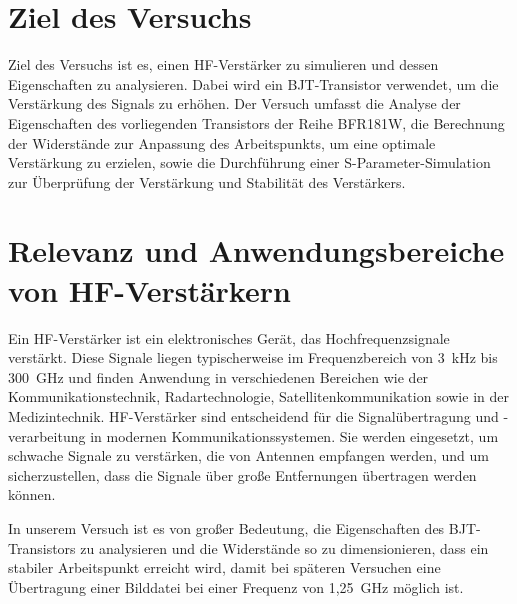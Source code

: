 \section{Ziel des Versuchs}
Ziel des Versuchs ist es, einen HF-Verstärker zu simulieren und dessen Eigenschaften zu analysieren. Dabei wird ein BJT-Transistor verwendet, um die Verstärkung des Signals zu erhöhen. 
Der Versuch umfasst die Analyse der Eigenschaften des vorliegenden Transistors der Reihe BFR181W, die Berechnung der Widerstände zur Anpassung des Arbeitspunkts, 
um eine optimale Verstärkung zu erzielen, sowie die Durchführung einer S-Parameter-Simulation zur Überprüfung der Verstärkung und Stabilität des Verstärkers.

\section{Relevanz und Anwendungsbereiche von HF-Verstärkern}
Ein HF-Verstärker ist ein elektronisches Gerät, das Hochfrequenzsignale verstärkt. Diese Signale liegen typischerweise im Frequenzbereich von 3~kHz bis 300~GHz und finden Anwendung in verschiedenen Bereichen wie der Kommunikationstechnik, Radartechnologie, Satellitenkommunikation sowie in der Medizintechnik.
HF-Verstärker sind entscheidend für die Signalübertragung und -verarbeitung in modernen Kommunikationssystemen. Sie werden eingesetzt, um schwache Signale zu verstärken, die von Antennen empfangen werden, und um sicherzustellen, dass die Signale über große Entfernungen übertragen werden können.

In unserem Versuch ist es von großer Bedeutung, die Eigenschaften des BJT-Transistors zu analysieren und die Widerstände so zu dimensionieren, dass ein stabiler Arbeitspunkt erreicht wird, damit bei späteren Versuchen eine Übertragung einer Bilddatei bei einer Frequenz von 1{,}25~GHz möglich ist.
\clearpage
